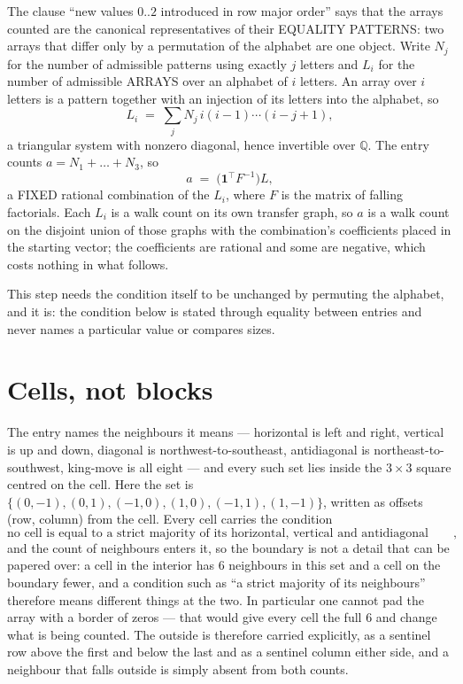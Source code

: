 \documentclass[11pt,a4paper]{article}
\theoremstyle{plain}
\theoremstyle{definition}
\begin{document}
The clause ``new values $0..2$ introduced in row major order'' says that the arrays
counted are the canonical representatives of their EQUALITY PATTERNS: two arrays that differ
only by a permutation of the alphabet are one object. Write $N_j$ for the number of admissible
patterns using exactly $j$ letters and $L_i$ for the number of admissible ARRAYS over an
alphabet of $i$ letters. An array over $i$ letters is a pattern together with an injection of
its letters into the alphabet, so
\[
L_i\;=\;\sum_{j}N_j\,i(i-1)\cdots(i-j+1),
\]
a triangular system with nonzero diagonal, hence invertible over $\mathbb{Q}$. The entry
counts $a=N_1+\dots+N_{3}$, so
\[
a\;=\;\bigl(\mathbf{1}^{\!\top}F^{-1}\bigr)L ,
\]
a FIXED rational combination of the $L_i$, where $F$ is the matrix of falling factorials.
Each $L_i$ is a walk count on its own transfer graph, so $a$ is a walk count on the disjoint
union of those graphs with the combination's coefficients placed in the starting vector; the
coefficients are rational and some are negative, which costs nothing in what follows.

This step needs the condition itself to be unchanged by permuting the alphabet, and it is:
the condition below is stated through equality between entries and never names a particular
value or compares sizes.

\section{Cells, not blocks}

The entry names the neighbours it means --- horizontal is left and right, vertical is up and
down, diagonal is northwest-to-southeast, antidiagonal is northeast-to-southwest, king-move is
all eight --- and every such set lies inside the $3\times3$ square centred on the cell. Here
the set is $\{(0,-1), (0,1), (-1,0), (1,0), (-1,1), (1,-1)\}$, written as offsets (row, column) from the cell. Every cell carries
the condition
\[
\text{no cell is equal to a strict majority of its horizontal, vertical and antidiagonal neighbours},
\]
and the count of neighbours enters it, so the boundary is not a detail that can be papered
over: a cell in the interior has $6$ neighbours in this set and a cell on the boundary
fewer, and a condition such as ``a strict majority of its neighbours'' therefore means
different things at the two. In particular one cannot pad the array with a border of zeros ---
that would give every cell the full $6$ and change what is being counted. The outside is
therefore carried
explicitly, as a sentinel row above the first and below the last and as a sentinel column
either side, and a neighbour that falls outside is simply absent from both counts.
\end{document}
